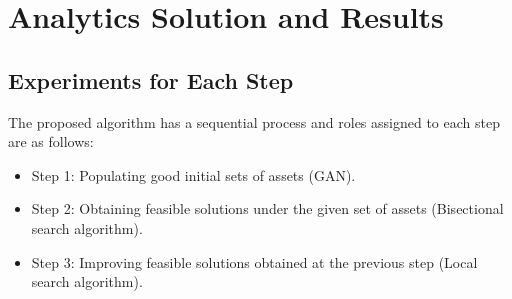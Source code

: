 \documentclass[11pt]{article}
\begin{document}
	
	
	
	\section*{Analytics Solution and Results}
	\setcounter{subsection}{0}
	
	\subsection{Experiments for Each Step}
	
	The proposed algorithm has a sequential process and roles assigned to each step are as follows:
	\begin{itemize}
		\item Step 1: Populating good initial sets of assets (GAN).
		\item Step 2: Obtaining feasible solutions under the given set of assets (Bisectional search algorithm).
		\item Step 3: Improving feasible solutions obtained at the previous step (Local search algorithm).
	\end{itemize}
	
\end{document}
